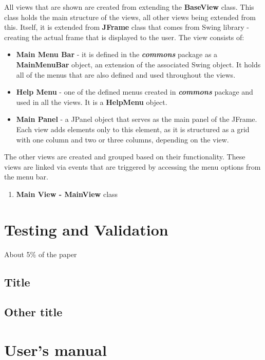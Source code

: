 \documentclass[12pt,a4paper,twoside]{report}
\begin{document}
\begin{enumerate}
All views that are shown are created from extending the \textbf {BaseView} class. This class holds the main structure of the views, all other views being extended from this. Itself, it is extended from \textbf{JFrame} class that comes from Swing library - creating the actual frame that is displayed to the user. The view consists of:
\begin{itemize}
 \item \textbf{Main Menu Bar} - it is defined in the \textbf{\textit{commons}} package as a \textbf{MainMenuBar} object, an extension of the associated Swing object. It holds all of the menus that are also defined and used throughout the views. 
 \item \textbf{Help Menu} - one of the defined menus created  in \textbf{\textit{commons}} package and used in all the views. It is a \textbf{HelpMenu} object. 
 \item \textbf{Main Panel} - a JPanel object that serves as the main panel of the JFrame. Each view adds elements only to this element, as it is structured as a grid with one column and two or three columns, depending on the view.
\end{itemize}

The other views are created and grouped based on their functionality. These views are linked via events that are triggered by accessing the menu options from the menu bar.  

\begin{enumerate}
 \item \textbf{Main View - MainView} class
 
 
 
 
\end{enumerate}


\end{enumerate}



\chapter{Testing and Validation}

About 5\% of the paper
\section{Title}
\section{Other title}

\chapter{User's manual}
\end{document}
